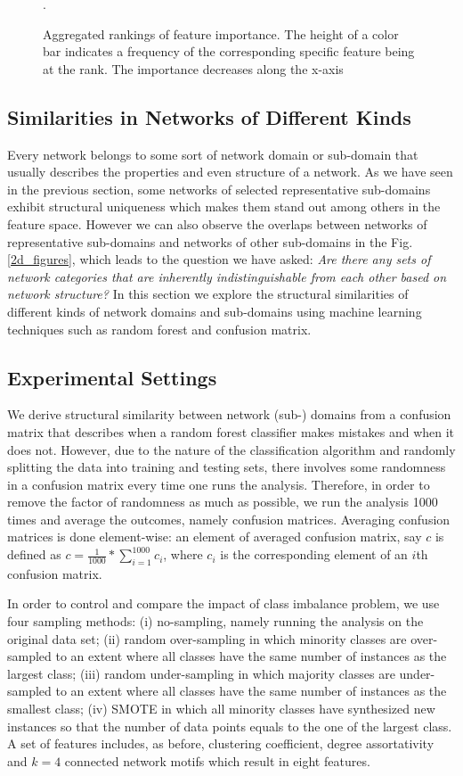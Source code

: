 \begin{figure}
\caption{Aggregated rankings of feature importance. The height of a color bar indicates a frequency of the corresponding specific feature being at the rank. The importance decreases along the x-axis} \label{feature_importance_figures}.
\end{figure}



\subsection*{Similarities in Networks of Different Kinds}
Every network belongs to some sort of network domain or sub-domain that usually describes the properties and even structure of a network. As we have seen in the previous section, some networks of selected representative sub-domains exhibit structural uniqueness which makes them stand out among others in the feature space. However we can also observe the overlaps between networks of representative sub-domains and networks of other sub-domains in the Fig. \ref{2d_figures}, which leads to the question we have asked:  \textit{Are there any sets of network categories that are inherently indistinguishable from each other based on network structure?} In this section we explore the structural similarities of different kinds of network domains and sub-domains using machine learning techniques such as random forest and confusion matrix.  

\subsection{Experimental Settings}
We derive structural similarity between network (sub-) domains from a confusion matrix that describes when a random forest classifier makes mistakes and when it does not. However, due to the nature of the classification algorithm and randomly splitting the data into training and testing sets, there involves some randomness in a confusion matrix every time one runs the analysis. Therefore, in order to remove the factor of randomness as much as possible, we run the analysis 1000 times and average the outcomes, namely confusion matrices. Averaging confusion matrices is done element-wise: an element of averaged confusion matrix, say $c$ is defined as $c = \frac{1}{1000}*\sum_{i=1}^{1000} c_i$, where $c_i$ is the corresponding element of an $i$th confusion matrix.

In order to control and compare the impact of class imbalance problem, we use four sampling methods: (i) no-sampling, namely running the analysis on the original data set; (ii) random over-sampling in which minority classes are over-sampled to an extent where all classes have the same number of instances as the largest class; (iii) random under-sampling in which majority classes are under-sampled to an extent where all classes have the same number of instances as the smallest class; (iv) SMOTE in which all minority classes have synthesized new instances so that the number of data points equals to the one of the largest class. A set of features includes, as before, clustering coefficient, degree assortativity and $k = 4$ connected network motifs which result in eight features.
 
